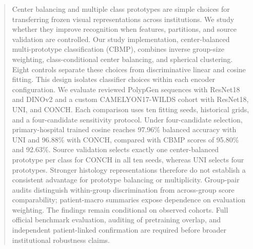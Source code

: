 \begin{abstract}
Center balancing and multiple class prototypes are simple choices for transferring frozen visual representations across institutions. We study whether they improve recognition when features, partitions, and source validation are controlled. Our study implementation, center-balanced multi-prototype classification (CBMP), combines inverse group-size weighting, class-conditional center balancing, and spherical clustering. Eight controls separate these choices from discriminative linear and cosine fitting. This design isolates classifier choices within each encoder configuration. We evaluate reviewed PolypGen sequences with ResNet18 and DINOv2 and a custom CAMELYON17-WILDS cohort with ResNet18, UNI, and CONCH. Each comparison uses ten fitting seeds, historical grids, and a four-candidate sensitivity protocol. Under four-candidate selection, primary-hospital trained cosine reaches 97.96\% balanced accuracy with UNI and 96.88\% with CONCH, compared with CBMP scores of 95.80\% and 92.63\%. Source validation selects exactly one center-balanced prototype per class for CONCH in all ten seeds, whereas UNI selects four prototypes. Stronger histology representations therefore do not establish a consistent advantage for prototype balancing or multiplicity. Group-pair audits distinguish within-group discrimination from across-group score comparability; patient-macro summaries expose dependence on evaluation weighting. The findings remain conditional on observed cohorts. Full official benchmark evaluation, auditing of pretraining overlap, and independent patient-linked confirmation are required before broader institutional robustness claims.
\end{abstract}

